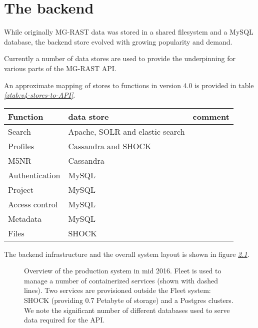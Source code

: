 \documentclass[letterpaper,10pt,english]{sphinxmanual}
\begin{document}
\section{The backend}
\label{\detokenize{user_manual:the-backend}}
While originally MG-RAST data was stored in a shared filesystem and a
MySQL database, the backend store evolved with growing popularity and
demand.

Currently a number of data stores are used to provide the underpinning
for various parts of the MG-RAST API.

An approximate mapping of stores to functions in version 4.0 is provided
in table {\hyperref[\detokenize{user_manual:xtab:v4-stores-to-API}]{\emph{{[}xtab:v4-stores-to-API{]}}}}.


\begin{savenotes}\sphinxattablestart
\centering
{}
\sphinxthecaptionisattop
{}\label{\detokenize{user_manual:id13}}
\sphinxaftertopcaption
\begin{tabulary}{\linewidth}[t]{|T|T|T|}
\hline
\sphinxstyletheadfamily 
Function
&\sphinxstyletheadfamily 
data store
&\sphinxstyletheadfamily 
comment
\\
\hline
Search
&
Apache, SOLR and elastic search
&\\
\hline
Profiles
&
Cassandra and SHOCK
&\\
\hline
M5NR
&
Cassandra
&\\
\hline
Authentication
&
MySQL
&\\
\hline
Project
&
MySQL
&\\
\hline
Access control
&
MySQL
&\\
\hline
Metadata
&
MySQL
&\\
\hline
Files
&
SHOCK
&\\
\hline
\end{tabulary}
\par
\sphinxattableend\end{savenotes}

The backend infrastructure and the overall system layout is shown in
figure {\hyperref[\detokenize{user_manual:fig:2016-production}]{\emph{2.1}}}.

\begin{figure}[htbp]
\centering
\capstart

\noindent{}
\caption{Overview of the production system in mid 2016. Fleet is used to
manage a number of containerized services (shown with dashed lines).
Two services are provisioned outside the Fleet system: SHOCK
(providing 0.7 Petabyte of storage) and a Postgres clusters. We note
the significant number of different databases used to serve data
required for the API.}\label{\detokenize{user_manual:fig-2016-production}}\end{figure}
\end{document}
